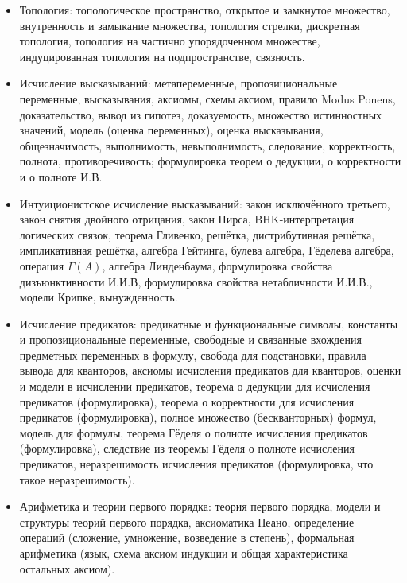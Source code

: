 \documentclass[11pt,a4paper,oneside]{article}
\begin{document}
\begin{itemize}
\item Топология: топологическое пространство,
открытое и замкнутое множество, внутренность и замыкание множества, топология стрелки,
дискретная топология, топология на частично упорядоченном множестве,
индуцированная топология на подпространстве, связность.
\item Исчисление высказываний: метапеременные, пропозициональные переменные,
высказывания, аксиомы, схемы аксиом, правило Modus Ponens, доказательство,
вывод из гипотез, доказуемость, множество истинностных значений, 
модель (оценка переменных), оценка высказывания, общезначимость, 
выполнимость, невыполнимость, следование, корректность, полнота, 
противоречивость; формулировка теорем о дедукции, о корректности и о полноте И.В.
\item Интуиционистское исчисление высказываний: 
закон исключённого третьего, закон снятия двойного отрицания,
закон Пирса, BHK-интер\-пре\-та\-ция логических связок, теорема Гливенко,
решётка, дистрибутивная решётка, импликативная решётка, 
алгебра Гейтинга, булева алгебра, 
Гёделева алгебра, операция $\Gamma(A)$, алгебра Линденбаума,
формулировка свойства дизъюнктивности И.И.В, формулировка свойства нетабличности И.И.В.,
модели Крипке, вынужденность.
\item Исчисление предикатов:
предикатные и функциональные символы, константы и пропозициональные переменные,
свободные и связанные вхождения предметных переменных в формулу, 
свобода для подстановки, правила вывода для кванторов, аксиомы исчисления предикатов 
для кванторов, оценки и модели в исчислении предикатов, теорема о дедукции для 
исчисления предикатов (формулировка), теорема о корректности для исчисления 
предикатов (формулировка), полное множество (бескванторных) формул, 
модель для формулы, теорема Гёделя о полноте исчисления предикатов (формулировка),
следствие из теоремы Гёделя о полноте исчисления предикатов, неразрешимость
исчисления предикатов (формулировка, что такое неразрешимость).
\item Арифметика и теории первого порядка:
теория первого порядка, модели и структуры теорий первого порядка,
аксиоматика Пеано, определение операций (сложение, умножение, возведение в степень),
формальная арифметика (язык, схема аксиом индукции и общая характеристика остальных аксиом).
\end{itemize}
\end{document}
